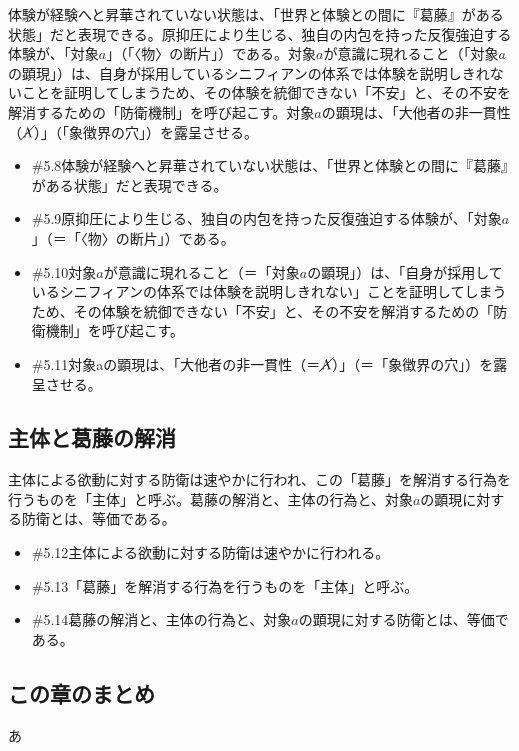 体験が経験へと昇華されていない状態は、「世界と体験との間に『葛藤』がある状態」だと表現できる。原抑圧により生じる、独自の内包を持った反復強迫する体験が、「対象\(a\)」（「〈物〉の断片」）である。対象\(a\)が意識に現れること（「対象\(a\)の顕現」）は、自身が採用しているシニフィアンの体系では体験を説明しきれないことを証明してしまうため、その体験を統御できない「不安」と、その不安を解消するための「防衛機制」を呼び起こす。対象\(a\)の顕現は、「大他者の非一貫性（\(\cancel{\textrm{A}}\)）」（「象徴界の穴」）を露呈させる。

\begin{note}{}
  \begin{itemize}
    \tightlist
    \item{\#5.8}体験が経験へと昇華されていない状態は、「世界と体験との間に『葛藤』がある状態」だと表現できる。
    \item{\#5.9}原抑圧により生じる、独自の内包を持った反復強迫する体験が、「対象$a$」（＝「〈物〉の断片」）である。
    \item{\#5.10}対象$a$が意識に現れること（＝「対象$a$の顕現」）は、「自身が採用しているシニフィアンの体系では体験を説明しきれない」ことを証明してしまうため、その体験を統御できない「不安」と、その不安を解消するための「防衛機制」を呼び起こす。
    \item{\#5.11}対象aの顕現は、「大他者の非一貫性（＝$\cancel{\textrm{A}}$）」（＝「象徴界の穴」）を露呈させる。
  \end{itemize}
\end{note}

\subsection{主体と葛藤の解消}\label{ux4e3bux4f53ux3068ux845bux85e4ux306eux89e3ux6d88}

主体による欲動に対する防衛は速やかに行われ、この「葛藤」を解消する行為を行うものを「主体」と呼ぶ。葛藤の解消と、主体の行為と、対象\(a\)の顕現に対する防衛とは、等価である。

\begin{note}{}
  \begin{itemize}
    \tightlist
    \item{\#5.12}主体による欲動に対する防衛は速やかに行われる。
    \item{\#5.13}「葛藤」を解消する行為を行うものを「主体」と呼ぶ。
    \item{\#5.14}葛藤の解消と、主体の行為と、対象$a$の顕現に対する防衛とは、等価である。
  \end{itemize}
\end{note}

\subsection{この章のまとめ}\label{ux3053ux306eux7ae0ux306eux307eux3068ux3081}

あ
